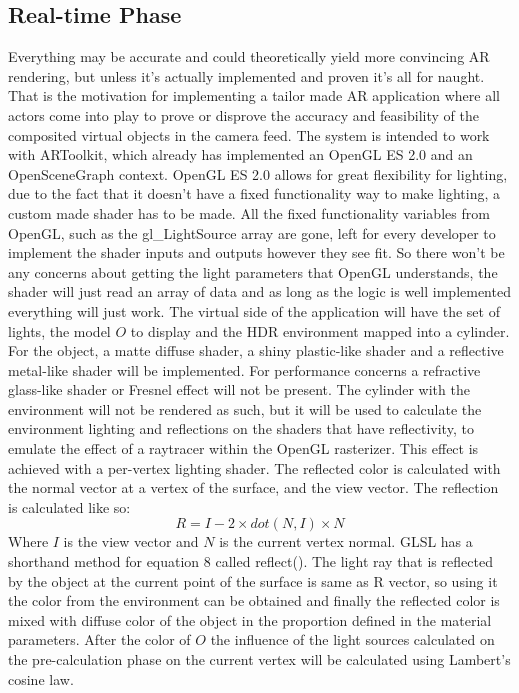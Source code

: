 \subsection{Real-time Phase}
Everything may be accurate and could theoretically yield more convincing AR rendering, but unless it's actually implemented and proven it's all for naught. That is the motivation for implementing a tailor made AR application where all actors come into play to prove or disprove the accuracy and feasibility of the composited virtual objects in the camera feed.\newline
The system is intended to work with ARToolkit, which already has implemented an OpenGL ES 2.0 and an OpenSceneGraph context. OpenGL ES 2.0 allows for great flexibility for lighting, due to the fact that it doesn't have a fixed functionality way to make lighting, a custom made shader has to be made. All the fixed functionality variables from OpenGL, such as the gl\_LightSource array are gone, left for every developer to implement the shader inputs and outputs however they see fit. So there won't be any concerns about getting the light parameters that OpenGL understands, the shader will just read an array of data and as long as the logic is well implemented everything will just work.\newline
The virtual side of the application will have the set of lights, the model $O$ to display and the HDR environment mapped into a cylinder. For the object, a matte diffuse shader, a shiny plastic-like shader and a reflective metal-like shader will be implemented. For performance concerns a refractive glass-like shader or Fresnel effect will not be present. The cylinder with the environment will not be rendered as such, but it will be used to calculate the environment lighting and reflections on the shaders that have reflectivity, to emulate the effect of a raytracer within the OpenGL rasterizer. This effect is achieved with a per-vertex lighting shader.  The reflected color is calculated with the normal vector at a vertex of the surface, and the view vector. The reflection is calculated like so:
\begin{equation}
    R = I - 2\times dot(N,I) \times N
\end{equation}
Where $I$ is the view vector and $N$ is the current vertex normal. GLSL has a shorthand method for equation 8 called reflect().
The light ray that is reflected by the object at the current point of the surface is same as R vector, so using it the color from the environment can be obtained and finally the reflected color is mixed with diffuse color of the object in the proportion defined in the material parameters. \newline
After the color of $O$ the influence of the light sources calculated on the pre-calculation phase on the current vertex will be calculated using Lambert's cosine law.